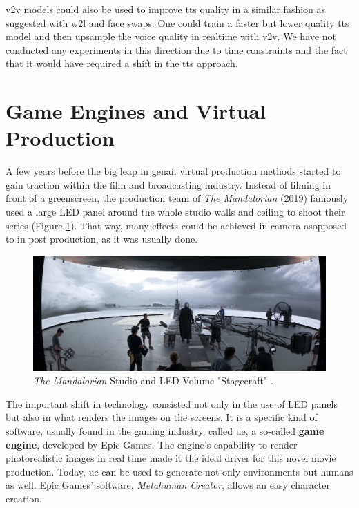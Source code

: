 \documentclass[
  a4paper,  %
  twoside,  %
  bibliography=totoc,
  headsepline,
  cleardoublepage=empty,
  parskip=half,
  draft=false
]{scrbook}
\begin{document}
\gls{v2v} models could also be used to improve \gls{tts} quality in a similar fashion as suggested with \gls{w2l} and face swaps: One could train a faster but lower quality \gls{tts} model and then upsample the voice quality in realtime with \gls{v2v}. We have not conducted any experiments in this direction due to time constraints and the fact that it would have required a shift in the \gls{tts} approach.

\section{Game Engines and Virtual Production}
\label{sec:bg-virtual-production}
A few years before the big leap in \gls{genai}, virtual production methods started to gain traction within the film and broadcasting industry. Instead of filming in front of a greenscreen, the production team of \textit{The Mandalorian} (2019) famously used a large LED panel around the whole studio walls and ceiling to shoot their series (Figure \ref{fig:mando-vps}). That way, many effects could be achieved in camera asopposed to in post production, as it was usually done.

\begin{figure}[h]
  \centering
  \includegraphics[width=1\textwidth]{./graphics/mandalorian-vp.jpg}
  \caption{\textit{The Mandalorian} Studio and LED-Volume "Stagecraft" \cite{landsiedelGamechanger2021}.}
  \label{fig:mando-vps}
\end{figure}

The important shift in technology consisted not only in the use of LED panels but also in what renders the images on the screens. It is a specific kind of software, usually found in the gaming industry, called \gls{ue}, a so-called \textbf{game engine}, developed by Epic Games. The engine's capability to render photorealistic images in real time made it the ideal driver for this novel movie production. Today, \gls{ue} can be used to generate not only environments but humans as well. Epic Games' software, \textit{Metahuman Creator}, allows an easy character creation. 
\end{document}
